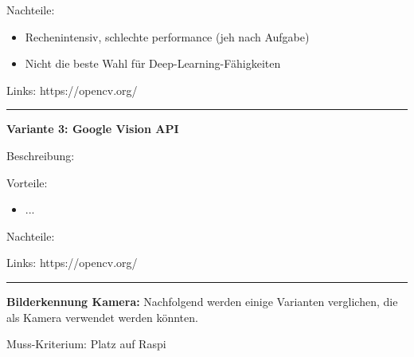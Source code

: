 Nachteile:
\begin{itemize}
    \item Rechenintensiv, schlechte performance (jeh nach Aufgabe)
    \item Nicht die beste Wahl für Deep-Learning-Fähigkeiten
\end{itemize}
Links: https://opencv.org/

\vspace{5pt}
\hrule

\textbf{Variante 3: Google Vision API}

Beschreibung:

Vorteile:
\begin{itemize}
    \item ...
\end{itemize}

Nachteile:

Links: https://opencv.org/

\vspace{5pt}
\hrule
\vspace{10pt}

\textbf{Bilderkennung Kamera:} Nachfolgend werden einige Varianten verglichen, die als Kamera verwendet werden könnten.

Muss-Kriterium: Platz auf Raspi